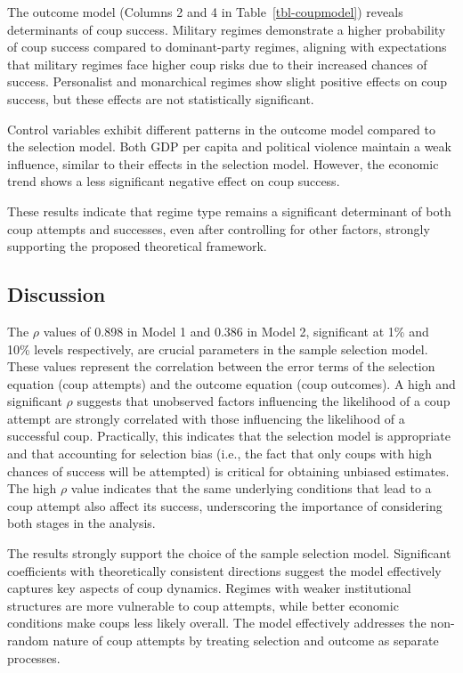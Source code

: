 \documentclass[
  12pt,
]{report}
\begin{document}
The outcome model (Columns 2 and 4 in Table~\ref{tbl-coupmodel}) reveals
determinants of coup success. Military regimes demonstrate a higher
probability of coup success compared to dominant-party regimes, aligning
with expectations that military regimes face higher coup risks due to
their increased chances of success. Personalist and monarchical regimes
show slight positive effects on coup success, but these effects are not
statistically significant.

Control variables exhibit different patterns in the outcome model
compared to the selection model. Both GDP per capita and political
violence maintain a weak influence, similar to their effects in the
selection model. However, the economic trend shows a less significant
negative effect on coup success.

These results indicate that regime type remains a significant
determinant of both coup attempts and successes, even after controlling
for other factors, strongly supporting the proposed theoretical
framework.

\subsection{Discussion}\label{discussion}

The \(\rho\) values of 0.898 in Model 1 and 0.386 in Model 2,
significant at 1\% and 10\% levels respectively, are crucial parameters
in the sample selection model. These values represent the correlation
between the error terms of the selection equation (coup attempts) and
the outcome equation (coup outcomes). A high and significant \(\rho\)
suggests that unobserved factors influencing the likelihood of a coup
attempt are strongly correlated with those influencing the likelihood of
a successful coup. Practically, this indicates that the selection model
is appropriate and that accounting for selection bias (i.e., the fact
that only coups with high chances of success will be attempted) is
critical for obtaining unbiased estimates. The high \(\rho\) value
indicates that the same underlying conditions that lead to a coup
attempt also affect its success, underscoring the importance of
considering both stages in the analysis.

The results strongly support the choice of the sample selection model.
Significant coefficients with theoretically consistent directions
suggest the model effectively captures key aspects of coup dynamics.
Regimes with weaker institutional structures are more vulnerable to coup
attempts, while better economic conditions make coups less likely
overall. The model effectively addresses the non-random nature of coup
attempts by treating selection and outcome as separate processes.
\end{document}
